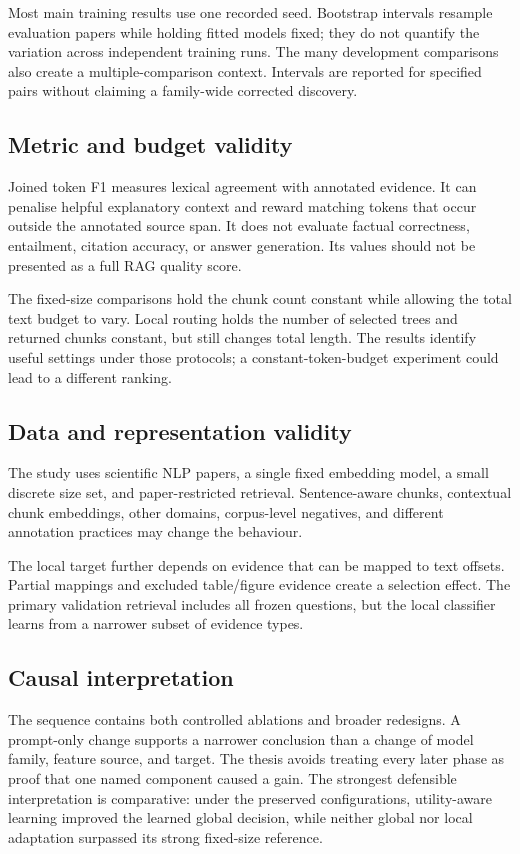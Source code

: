 Most main training results use one recorded seed. Bootstrap
intervals resample evaluation papers while holding fitted models
fixed; they do not quantify the variation across independent
training runs. The many development comparisons also create a
multiple-comparison context. Intervals are reported for specified
pairs without claiming a family-wide corrected discovery.

\subsection{Metric and budget validity}
Joined token F1 measures lexical agreement with annotated
evidence. It can penalise helpful explanatory context and reward
matching tokens that occur outside the annotated source span.
It does not evaluate factual correctness, entailment, citation
accuracy, or answer generation. Its values should not be
presented as a full RAG quality score.

The fixed-size comparisons hold the chunk count constant while
allowing the total text budget to vary. Local routing holds
the number of selected trees and returned chunks constant, but
still changes total length. The results identify useful settings
under those protocols; a constant-token-budget experiment could
lead to a different ranking.

\subsection{Data and representation validity}
The study uses scientific NLP papers, a single fixed embedding
model, a small discrete size set, and paper-restricted retrieval.
Sentence-aware chunks, contextual chunk embeddings, other
domains, corpus-level negatives, and different annotation
practices may change the behaviour.

The local target further depends on evidence that can be mapped
to text offsets. Partial mappings and excluded table/figure
evidence create a selection effect. The primary validation
retrieval includes all frozen questions, but the local classifier
learns from a narrower subset of evidence types.

\subsection{Causal interpretation}
The sequence contains both controlled ablations and broader
redesigns. A prompt-only change supports a narrower conclusion
than a change of model family, feature source, and target.
The thesis avoids treating every later phase as proof that
one named component caused a gain. The strongest defensible
interpretation is comparative: under the preserved configurations,
utility-aware learning improved the learned global decision,
while neither global nor local adaptation surpassed its
strong fixed-size reference.

